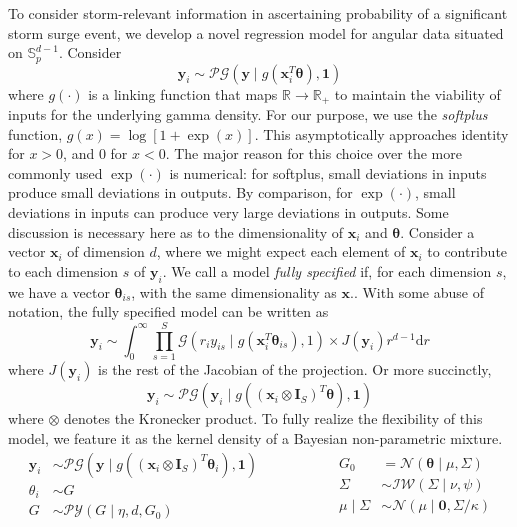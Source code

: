To consider storm-relevant information in ascertaining probability of a significant storm surge event, 
    we develop a novel regression model for angular data situated on $\mathbb{S}_p^{d-1}$.  Consider
    \[
        \bm{y}_i \sim \mathcal{PG}(\bm{y}\mid g(\bm{x}_i^T\bm{\theta}), \bm{1})    
    \]
    where $g(\cdot)$ is a linking function that maps $\mathbb{R}\to\mathbb{R}_+$ to maintain the
    viability of inputs for the underlying gamma density.  For our purpose, we use the \emph{softplus}
    function, $g(x) = \log[1 + \exp(x)]$.  This asymptotically approaches identity for $x > 0$, and 
    0 for $x < 0$. The major reason for this choice over the more commonly used $\exp(\cdot)$ is 
    numerical: for softplus, small deviations in inputs produce small deviations in outputs.  By 
    comparison, for $\exp(\cdot)$, small deviations in inputs can produce very large deviations in 
    outputs.  Some discussion is necessary here as to the dimensionality of $\bm{x}_i$ and $\bm{\theta}$.  
    Consider a vector $\bm{x}_i$ of dimension $d$, where we might expect each element of $\bm{x}_i$ 
    to contribute to each dimension $s$ of $\bm{y}_i$.  We call a model \emph{fully specified} if, 
    for each dimension $s$, we have a vector $\bm{\theta}_{is}$, with the same dimensionality as 
    $\bm{x}$.. With some abuse of notation, the fully specified model can be written as
    \[
        \bm{y}_i \sim \int_0^{\infty}
            \prod_{s = 1}^S \mathcal{G}\left(r_iy_{is}\mid 
                g(\bm{x}_i^T\bm{\theta}_{is}), 1\right) \times J(\bm{y}_i) r^{d-1}\text{d}r
    \]
    where $J(\bm{y}_i)$ is the rest of the Jacobian of the projection.  Or more succinctly, 
    \[
        \bm{y}_i \sim \mathcal{PG}\left(\bm{y}_i \mid g((\bm{x}_i 
            \otimes \bm{I}_{S})^T\bm{\theta}), \bm{1}\right)
    \]
    where $\otimes$ denotes the Kronecker product.  To fully realize the flexibility of this model,
    we feature it as the kernel density of a Bayesian non-parametric mixture.
    \begin{equation}
        \label{eqn:regressionmodel}
        \begin{aligned}
            \bm{y}_i &\sim \mathcal{PG}\left(\bm{y}\mid 
                g\left((\bm{x}_i\otimes\bm{I}_S)^T\bm{\theta}_i\right), \bm{1}\right)\\
            \theta_i &\sim G\\
            G &\sim \mathcal{PY}(G\mid\eta, d, G_0)
        \end{aligned}
        ~\hspace{2cm}
        \begin{aligned}
            G_0 &= \mathcal{N}(\bm{\theta} \mid \mu, \Sigma)\\
            \Sigma &\sim \mathcal{IW}(\Sigma\mid \nu, \psi)\\
            \mu\mid\Sigma &\sim \mathcal{N}(\mu\mid \bm{0}, \Sigma / \kappa)
        \end{aligned}
    \end{equation}

